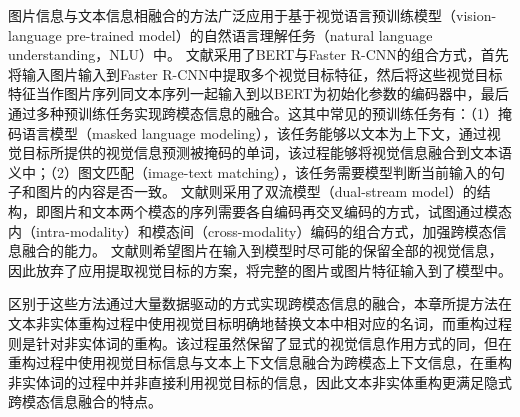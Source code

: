 图片信息与文本信息相融合的方法广泛应用于基于视觉语言预训练模型（vision-language pre-trained model）的自然语言理解任务（natural language understanding，NLU）中。
文献\cite{57_visual_bert,58_unicoder_vl,59_vl_bert,60_uniter}采用了BERT\cite{25_DBLP:conf/naacl/DevlinCLT19}与Faster R-CNN\cite{DBLP:conf/nips/RenHGS15}的组合方式，首先将输入图片输入到Faster R-CNN中提取多个视觉目标特征，然后将这些视觉目标特征当作图片序列同文本序列一起输入到以BERT为初始化参数的编码器中，最后通过多种预训练任务实现跨模态信息的融合。这其中常见的预训练任务有：（1）掩码语言模型（masked language modeling），该任务能够以文本为上下文，通过视觉目标所提供的视觉信息预测被掩码的单词，该过程能够将视觉信息融合到文本语义中；（2）图文匹配（image-text matching），该任务需要模型判断当前输入的句子和图片的内容是否一致。
文献\cite{61_vilbert,62_lxmert}则采用了双流模型（dual-stream model）的结构，即图片和文本两个模态的序列需要各自编码再交叉编码的方式，试图通过模态内（intra-modality）和模态间（cross-modality）编码的组合方式，加强跨模态信息融合的能力。
文献\cite{63_albef,64_pixel_bert,65_vilt}则希望图片在输入到模型时尽可能的保留全部的视觉信息，因此放弃了应用提取视觉目标的方案，将完整的图片或图片特征输入到了模型中。

区别于这些方法通过大量数据驱动的方式实现跨模态信息的融合，本章所提方法在文本非实体重构过程中使用视觉目标明确地替换文本中相对应的名词，而重构过程则是针对非实体词的重构。该过程虽然保留了显式的视觉信息作用方式的同，但在重构过程中使用视觉目标信息与文本上下文信息融合为跨模态上下文信息，在重构非实体词的过程中并非直接利用视觉目标的信息，因此文本非实体重构更满足隐式跨模态信息融合的特点。






